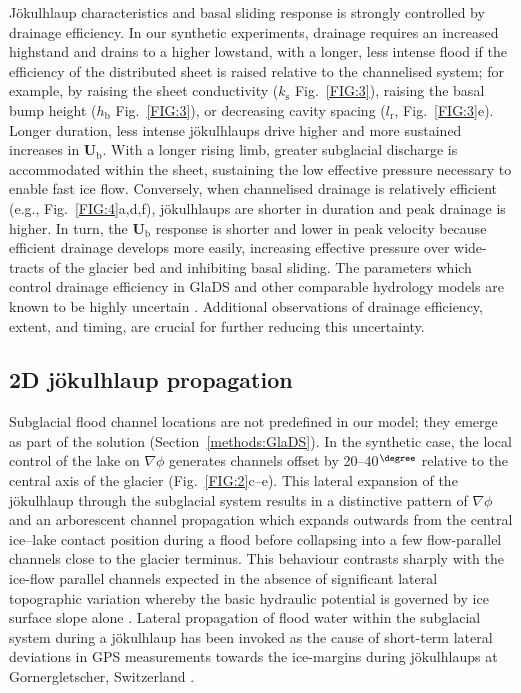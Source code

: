 \documentclass[tc, manuscript]{copernicus}
\begin{document}
Jökulhlaup characteristics and basal sliding response is strongly controlled by drainage efficiency. In our synthetic experiments, drainage requires an increased highstand and drains to a higher lowstand, with a longer, less intense flood if the efficiency of the distributed sheet is raised relative to the channelised system; for example, by raising the sheet conductivity ($k_{\mathrm{s}}$ Fig.~\ref{FIG:3}), raising the basal bump height ($h_{\mathrm{b}}$ Fig.~\ref{FIG:3}), or decreasing cavity spacing ($l_{\mathrm{r}}$, Fig.~\ref{FIG:3}e). Longer duration, less intense jökulhlaups drive higher and more sustained increases in $\mathbf{U}_{\mathrm{b}}$. With a longer rising limb, greater subglacial discharge is accommodated within the sheet, sustaining the low effective pressure necessary to enable fast ice flow. Conversely, when channelised drainage is relatively efficient (e.g., Fig.~\ref{FIG:4}a,d,f), jökulhlaups are shorter in duration and peak drainage is higher. In turn, the $\mathbf{U}_{\mathrm{b}}$ response is shorter and lower in peak velocity because efficient drainage develops more easily, increasing effective pressure over wide-tracts of the glacier bed and inhibiting basal sliding. The parameters which control drainage efficiency in GlaDS and other comparable hydrology models are known to be highly uncertain \citep{werder2013modeling}. Additional observations of drainage efficiency, extent, and timing, are crucial for further reducing this uncertainty.

\subsection{2D jökulhlaup propagation}

Subglacial flood channel locations are not predefined in our model; they emerge as part of the solution (Section~\ref{methods:GlaDS}). In the synthetic case, the local control of the lake on $\nabla \phi$ generates channels offset by 20--40$^{\degree}$ relative to the central axis of the glacier (Fig.~\ref{FIG:2}c--e). This lateral expansion of the jökulhlaup through the subglacial system results in a distinctive pattern of $\nabla\phi$ and an arborescent channel propagation which expands outwards from the central ice--lake contact position during a flood before collapsing into a few flow-parallel channels close to the glacier terminus. This behaviour contrasts sharply with the ice-flow parallel channels expected in the absence of significant lateral topographic variation whereby the basic hydraulic potential is governed by ice surface slope alone \citep[e.g., see Figure 2 in][]{werder2013modeling}. Lateral propagation of flood water within the subglacial system during a jökulhlaup has been invoked as the cause of short-term lateral deviations in GPS measurements towards the ice-margins during jökulhlaups at Gornergletscher, Switzerland \citep{sugiyama2007reversal}.
\end{document}
